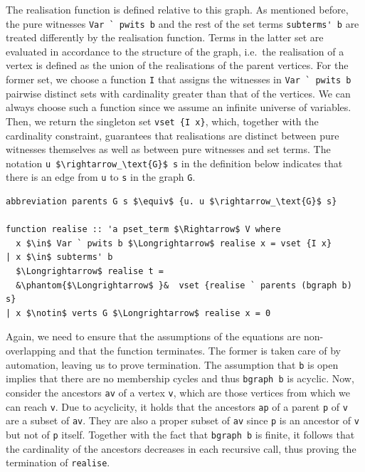 \documentclass[
  sigplan,
  10pt,
  ]{acmart}
\begin{document}
The realisation function is defined relative to this graph.
As mentioned before, the pure witnesses \lstinline!Var ` pwits b! and the rest of the set terms \lstinline!subterms' b! are treated differently by the realisation function.
Terms in the latter set are evaluated in accordance to the structure of the graph, i.e.\ the realisation of a vertex is defined as the union of the realisations of the parent vertices. 
For the former set, we choose a function \lstinline!I! that assigns the witnesses in \lstinline!Var ` pwits b! pairwise distinct sets with cardinality greater than that of the vertices.
We can always choose such a function since we assume an infinite universe of variables.
Then, we return the singleton set \lstinline!vset {I x}!, which, together with the cardinality constraint, guarantees that realisations are distinct between pure witnesses themselves as well as between pure witnesses and set terms.  
The notation \lstinline!u $\rightarrow_\text{G}$ s! in the definition below indicates that there is an edge from \lstinline!u! to \lstinline!s! in the graph \lstinline!G!.
\begin{lstlisting}
abbreviation parents G s $\equiv$ {u. u $\rightarrow_\text{G}$ s}

function realise :: 'a pset_term $\Rightarrow$ V where
  x $\in$ Var ` pwits b $\Longrightarrow$ realise x = vset {I x}
| x $\in$ subterms' b
  $\Longrightarrow$ realise t =
  &\phantom{$\Longrightarrow$ }&  vset {realise ` parents (bgraph b) s}
| x $\notin$ verts G $\Longrightarrow$ realise x = 0
\end{lstlisting}

Again, we need to ensure that the assumptions of the equations are non-overlapping and that the function terminates.
The former is taken care of by automation, leaving us to prove termination.
The assumption that \lstinline!b! is open implies that there are no membership cycles and thus \lstinline!bgraph b! is acyclic.
Now, consider the ancestors \lstinline!av! of a vertex \lstinline!v!, which are those vertices from which we can reach \lstinline!v!.
Due to acyclicity, it holds that the ancestors \lstinline!ap! of a parent \lstinline!p! of \lstinline!v! are a subset of \lstinline!av!.
They are also a proper subset of \lstinline!av! since \lstinline!p! is an ancestor of \lstinline!v! but not of \lstinline!p! itself.
Together with the fact that \lstinline!bgraph b! is finite, it follows that the cardinality of the ancestors decreases in each recursive call, thus proving the termination of \lstinline!realise!.
\end{document}
